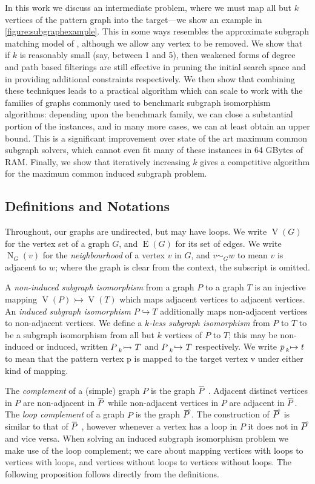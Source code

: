 \documentclass[letterpaper]{article}
\newcommand{\citet}[1]{\citeauthor{#1} \shortcite{#1}}
\theoremstyle{definition}
\newcommand{\shortoverline}[1]{\mkern 1.5mu\overline{\mkern-1.5mu#1\mkern-1.5mu}\mkern 1.5mu}
\newcommand{\lessnonind}[1]{\prescript{}{#1}{\rightarrowtail}\ }
\newcommand{\lessind}[1]{\prescript{}{#1}{\hookrightarrow}\ }
\newcommand{\lessmap}[1]{\prescript{}{#1}{\mapsto}\ }
\newcommand{\V}{\operatorname{V}}
\newcommand{\EdgeSet}{\operatorname{E}}
\newcommand{\N}{\operatorname{N}}
\newcommand{\loopcomp}[1]{\tset{\multimap}{#1}}
\newcommand{\tset}[2]{%
    \tikz[baseline=(X.base),inner sep=0pt,outer sep=0pt]{%
        \node[inner sep=0pt,outer sep=0pt] (X) {$#2$};
        \node[yshift=1.5pt,xshift=1pt] at (X.north) {$\scriptstyle#1$};
}}
\begin{document}
In this work we discuss an intermediate problem, where we must map all but $k$ vertices of the
pattern graph into the target---we show an example in \cref{figure:subgraphexample}. This in some
ways resembles the approximate subgraph matching model of \citet{DBLP:conf/cp/ZampelliDD05},
although we allow any vertex to be removed. We show that if
$k$ is reasonably small (say, between 1 and 5), then weakened forms of degree and path based
filterings are still effective in pruning the initial search space and in providing additional
constraints respectively. We then show that combining these techniques leads to a practical
algorithm which can scale to work with the families of graphs commonly used to benchmark subgraph
isomorphism algorithms: depending upon the benchmark family, we can close a substantial portion of
the instances, and in many more cases, we can at least obtain an upper bound. This is a significant
improvement over state of the art maximum common subgraph solvers, which cannot even fit many of
these instances in 64 GBytes of RAM. Finally, we show that iteratively increasing $k$ gives a
competitive algorithm for the maximum common induced subgraph problem.

\subsection{Definitions and Notations} \label{section:definitions}

Throughout, our graphs are undirected, but may have loops.  We write $\V(G)$ for the vertex set of a
graph $G$, and $\EdgeSet(G)$ for its set of edges. We write $\N_G(v)$ for the \emph{neighbourhood}
of a vertex $v$ in $G$, and $v \sim_G w$ to mean $v$ is adjacent to $w$; where the graph is clear
from the context, the subscript is omitted.

A \emph{non-induced subgraph isomorphism} from a graph $P$ to a graph $T$ is an injective mapping
$\V(P) \rightarrowtail \V(T) $ which maps adjacent vertices to adjacent vertices. An \emph{induced subgraph
isomorphism} $P \hookrightarrow T$ additionally maps non-adjacent vertices to non-adjacent vertices.
We define a \emph{$k$-less subgraph isomorphism} from $P$ to $T$ to be a subgraph isomorphism from all but
$k$ vertices of $P$ to $T$; this may be non-induced or induced, written $P \lessnonind{k} T$ and $P
\lessind{k} T$ respectively. We write $p \lessmap{k} t$ to mean that the pattern vertex p is mapped
to the target vertex v under either kind of mapping.

The \emph{complement} of a (simple) graph $P$ is the graph $\shortoverline{P}~$.  Adjacent distinct
vertices in $P$ are non-adjacent in $\shortoverline{P}$ while non-adjacent vertices in $P$ are
adjacent in $\shortoverline{P}$.  The \emph{loop complement} of a graph $P$ is the graph
$\loopcomp{P}$.  The construction of $\loopcomp{P}$ is similar to that of $\shortoverline{P}~$, however
whenever a vertex has a loop in $P$ it does not in $\loopcomp{P}$ and vice versa.  When solving an
induced subgraph isomorphism problem we make use of the loop complement; we care about mapping
vertices with loops to vertices with loops, and vertices without loops to vertices without loops.
The following proposition follows directly from the definitions.
\end{document}
